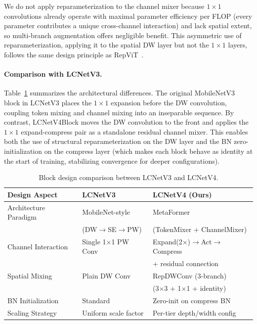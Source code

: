 \documentclass[11pt, a4paper,logo,  copyright, nonumbering]{paddleocr}
\begin{document}
We do not apply reparameterization to the channel mixer because $1\times1$ convolutions already operate with maximal parameter efficiency per FLOP (every parameter contributes a unique cross-channel interaction) and lack spatial extent, so multi-branch augmentation offers negligible benefit. This asymmetric use of reparameterization, applying it to the spatial DW layer but not the $1\times1$ layers, follows the same design principle as RepViT~\cite{wang2024repvit}.

\paragraph{Comparison with LCNetV3.}
Table~\ref{tab:block_compare} summarizes the architectural differences. The original MobileNetV3 block in LCNetV3 places the $1\times1$ expansion before the DW convolution, coupling token mixing and channel mixing into an inseparable sequence. By contrast, LCNetV4Block moves the DW convolution to the front and applies the $1\times1$ expand-compress pair as a standalone residual channel mixer. This enables both the use of structural reparameterization on the DW layer and the BN zero-initialization on the compress layer (which makes each block behave as identity at the start of training, stabilizing convergence for deeper configurations).

\begin{table}[t]
\centering
\small
\begin{tabular}{lll}
\toprule
\textbf{Design Aspect} & \textbf{LCNetV3} & \textbf{LCNetV4 (Ours)} \\
\midrule
Architecture Paradigm & MobileNet-style & MetaFormer \\
 & (DW$\to$SE$\to$PW) & (TokenMixer + ChannelMixer) \\
Channel Interaction & Single 1$\times$1 PW Conv & Expand(2$\times$)$\to$Act$\to$Compress \\
 & & + residual connection \\
Spatial Mixing & Plain DW Conv & RepDWConv (3-branch) \\
 & & (3$\times$3 + 1$\times$1 + identity) \\
BN Initialization & Standard & Zero-init on compress BN \\
Scaling Strategy & Uniform scale factor & Per-tier depth/width config \\
\bottomrule
\end{tabular}
\caption{Block design comparison between LCNetV3 and LCNetV4.}
\label{tab:block_compare}
\end{table}
\end{document}
